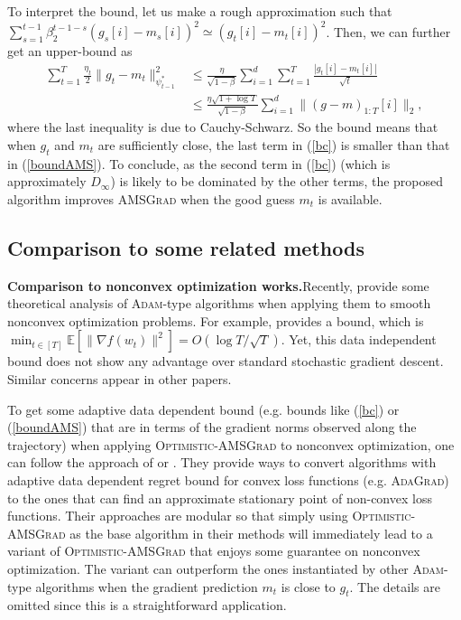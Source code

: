 \documentclass[11pt]{article}
\theoremstyle{k}
\begin{document}
To interpret the bound, let us make a rough approximation such that
$\sum_{s=1}^{t-1} \beta_2^{t-1-s} (g_{s}[i] - m_{s}[i])^2  \simeq (g_{t}[i] - m_t[i])^2 $.
Then, we can further get an upper-bound as 
\begin{align*}
    \sum_{t=1}^T \frac{\eta_t}{2} \|g_t - m_t  \|_{\psi_{t-1}^*}^2 &\leq
    \frac{\eta}{\sqrt{1 - \beta}} \sum_{i=1}^d \sum_{t=1}^{T} \frac{ | g_{t}[i] - m_{t}[i] | }{ \sqrt{t} }\\
    &\leq \frac{\eta \sqrt{1 + \log T}}{\sqrt{1 - \beta}} \sum_{i=1}^d \| (g-m)_{1:T}[i] \|_2 ,
\end{align*}
where the last inequality is due to Cauchy-Schwarz. So the bound means that when
$g_{t}$ and $m_t$ are sufficiently close, the last term in (\ref{bc})
is smaller than that in (\ref{boundAMS}).
To conclude, as the second term in (\ref{bc}) (which is approximately $D_{\infty}$) is likely to be dominated by the other terms, the proposed algorithm improves \textsc{AMSGrad} when the good guess $m_t$ is available.

\subsection{Comparison to some related methods} \label{app:related}

\textbf{Comparison to nonconvex optimization works.}\hspace{0.1in}Recently, \cite{ZRSKK18,CLSH19,WWB18,ZTYCG18,ZS18,LO18} provide some theoretical analysis 
of \textsc{Adam}-type algorithms when applying them to smooth nonconvex optimization problems.
For example, \cite{CLSH19} provides a bound,
which is $\min_{t \in [T]} \mathbb{E}[\| \nabla f(w_t) \|^2 ] = O(\log T / \sqrt{T}) $.
Yet, this data independent bound does not show any advantage over standard stochastic gradient descent. Similar concerns appear in other papers.

To get some adaptive data dependent bound (e.g. bounds like (\ref{bc}) or (\ref{boundAMS})
that are in terms of the gradient norms observed along the trajectory) when applying 
\textsc{Optimistic-AMSGrad} to nonconvex optimization,
one can follow the approach of \cite{Princeton18} or \cite{CYYZC19}.
They provide ways to convert algorithms with adaptive data dependent regret bound
for convex loss functions (e.g. \textsc{AdaGrad}) to the ones that can find an approximate stationary point of non-convex loss functions. 
Their approaches are modular so that simply using \textsc{Optimistic-AMSGrad}
as the base algorithm in their methods will immediately lead to a variant of \textsc{Optimistic-AMSGrad} that enjoys some guarantee on nonconvex optimization.
The variant can outperform the ones instantiated by other \textsc{Adam}-type algorithms when
the gradient prediction $m_t$ is close to $g_t$.
The details are omitted since this is a straightforward application.
\end{document}
